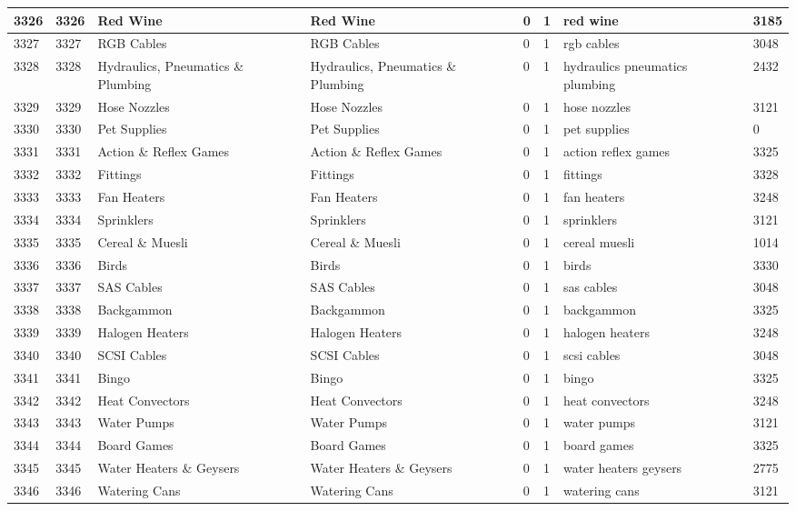\begin{longtable}{|l|l|l|l|l|l|l|l|}
3326 & 3326 & Red Wine & Red Wine & 0 & 1 & red wine & 3185 \\ \hline 
3327 & 3327 & RGB Cables & RGB Cables & 0 & 1 & rgb cables & 3048 \\ \hline 
3328 & 3328 & Hydraulics, Pneumatics \& Plumbing & Hydraulics, Pneumatics \& Plumbing & 0 & 1 & hydraulics pneumatics plumbing & 2432 \\ \hline 
3329 & 3329 & Hose Nozzles & Hose Nozzles & 0 & 1 & hose nozzles & 3121 \\ \hline 
3330 & 3330 & Pet Supplies & Pet Supplies & 0 & 1 & pet supplies & 0 \\ \hline 
3331 & 3331 & Action \& Reflex Games & Action \& Reflex Games & 0 & 1 & action reflex games & 3325 \\ \hline 
3332 & 3332 & Fittings & Fittings & 0 & 1 & fittings & 3328 \\ \hline 
3333 & 3333 & Fan Heaters & Fan Heaters & 0 & 1 & fan heaters & 3248 \\ \hline 
3334 & 3334 & Sprinklers & Sprinklers & 0 & 1 & sprinklers & 3121 \\ \hline 
3335 & 3335 & Cereal \& Muesli & Cereal \& Muesli & 0 & 1 & cereal muesli & 1014 \\ \hline 
3336 & 3336 & Birds & Birds & 0 & 1 & birds & 3330 \\ \hline 
3337 & 3337 & SAS Cables & SAS Cables & 0 & 1 & sas cables & 3048 \\ \hline 
3338 & 3338 & Backgammon & Backgammon & 0 & 1 & backgammon & 3325 \\ \hline 
3339 & 3339 & Halogen Heaters & Halogen Heaters & 0 & 1 & halogen heaters & 3248 \\ \hline 
3340 & 3340 & SCSI Cables & SCSI Cables & 0 & 1 & scsi cables & 3048 \\ \hline 
3341 & 3341 & Bingo & Bingo & 0 & 1 & bingo & 3325 \\ \hline 
3342 & 3342 & Heat Convectors & Heat Convectors & 0 & 1 & heat convectors & 3248 \\ \hline 
3343 & 3343 & Water Pumps & Water Pumps & 0 & 1 & water pumps & 3121 \\ \hline 
3344 & 3344 & Board Games & Board Games & 0 & 1 & board games & 3325 \\ \hline 
3345 & 3345 & Water Heaters \& Geysers & Water Heaters \& Geysers & 0 & 1 & water heaters geysers & 2775 \\ \hline 
3346 & 3346 & Watering Cans & Watering Cans & 0 & 1 & watering cans & 3121 \\ \hline 

\end{longtable}

